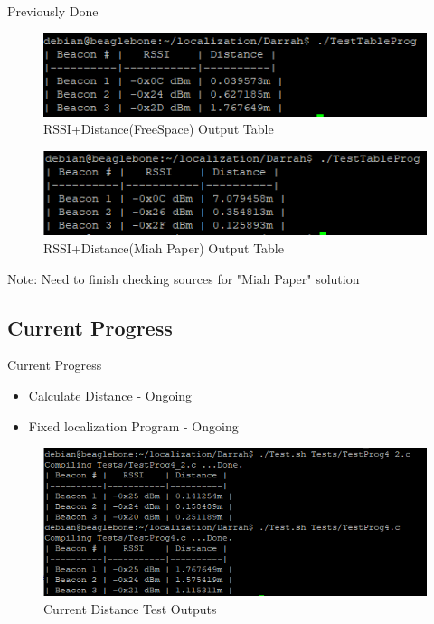 \documentclass{beamer}
\begin{document}
\begin{frame}{Previously Done}
    \begin{figure}
    \centering
    \includegraphics[scale=0.8]{figs/ScreenShots/RSSIOutputTableDist.PNG}
    \caption{RSSI+Distance(FreeSpace) Output Table}
    \label{fig:RSSIOutputTable_Darrah}
    \end{figure}
    
    \begin{figure}
    \centering
    \includegraphics[scale=0.8]{figs/ScreenShots/RSSIOutputTableDist_2.PNG}
    \caption{RSSI+Distance(Miah Paper) Output Table}
    \label{fig:RSSIOutputTable_Paper}
    \end{figure}
    
    Note: Need to finish checking sources for "Miah Paper" solution
\end{frame}


\subsection{Current Progress}
\begin{frame}{Current Progress}
    \begin{itemize}
    \item Calculate Distance - Ongoing
    \item Fixed localization Program - Ongoing
    \end{itemize}
    
    \begin{figure}
    \centering
    \includegraphics[scale=0.8]{figs/ScreenShots/DistanceFormulaOutputs.PNG}
    \caption{Current Distance Test Outputs}
    \label{fig:RSSIOutputTable_Paper}
    \end{figure}
\end{frame}
\end{document}
